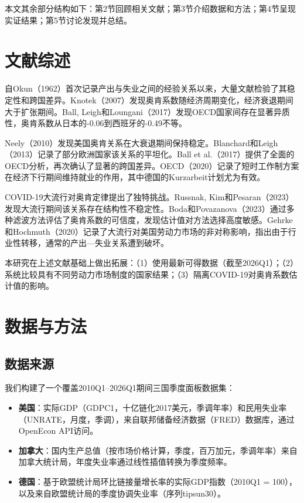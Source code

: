\documentclass[12pt,a4paper,UTF8]{ctexart}
\begin{document}
本文其余部分结构如下：第2节回顾相关文献；第3节介绍数据和方法；第4节呈现实证结果；第5节讨论发现并总结。

\section{文献综述}

自Okun（1962）首次记录产出与失业之间的经验关系以来，大量文献检验了其稳定性和跨国差异。Knotek（2007）发现奥肯系数随经济周期变化，经济衰退期间大于扩张期间。Ball, Leigh和Loungani（2017）发现OECD国家间存在显著异质性，奥肯系数从日本的-0.06到西班牙的-0.49不等。

Neely（2010）发现美国奥肯关系在大衰退期间保持稳定。Blanchard和Leigh（2013）记录了部分欧洲国家该关系的平坦化。Ball et al.（2017）提供了全面的OECD分析，再次确认了显著的跨国差异。OECD（2020）记录了短时工作制方案在经济下行期间维持就业的作用，其中德国的Kurzarbeit计划尤为有效。

COVID-19大流行对奥肯定律提出了独特挑战。Russnak, Kim和Pesaran（2023）发现大流行期间该关系存在结构性不稳定性。Boda和Povazanova（2023）通过多种滤波方法评估了奥肯系数的可信度，发现估计值对方法选择高度敏感。Gehrke和Hochmuth（2020）记录了大流行对美国劳动力市场的非对称影响，指出由于行业性转移，通常的产出—失业关系遭到破坏。

本研究在上述文献基础上做出拓展：（1）使用最新可得数据（截至2026Q1）；（2）系统比较具有不同劳动力市场制度的国家结果；（3）隔离COVID-19对奥肯系数估计值的影响。

\section{数据与方法}

\subsection{数据来源}

我们构建了一个覆盖2010Q1--2026Q1期间三国季度面板数据集：

\begin{itemize}
    \item \textbf{美国}：实际GDP（GDPC1，十亿链化2017美元，季调年率）和民用失业率（UNRATE，月度，季调），来自联邦储备经济数据（FRED）数据库，通过OpenEcon API访问。
    \item \textbf{加拿大}：国内生产总值（按市场价格计算，季度，百万加元，季调年率）来自加拿大统计局，年度失业率通过线性插值转换为季度频率。
    \item \textbf{德国}：基于欧盟统计局环比链接量增长率的实际GDP指数（2010Q1 = 100），以及来自欧盟统计局的季度协调失业率（序列tipsun30）。
\end{itemize}
\end{document}

